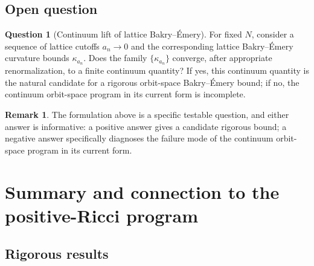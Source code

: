 \documentclass[11pt,letterpaper]{article}
\theoremstyle{definition}
\newtheorem{remark}[theorem]{Remark}
\newtheorem{question}[theorem]{Question}
\begin{document}
\subsection{Open question}

\begin{question}[Continuum lift of lattice Bakry--\'Emery]\label{q:continuum-lift}
For fixed $N$, consider a sequence of lattice cutoffs $a_n \to 0$ and the corresponding lattice Bakry--\'Emery curvature bounds $\kappa_{a_n}$. Does the family $\{\kappa_{a_n}\}$ converge, after appropriate renormalization, to a finite continuum quantity? If yes, this continuum quantity is the natural candidate for a rigorous orbit-space Bakry--\'Emery bound; if no, the continuum orbit-space program in its current form is incomplete.
\end{question}

\begin{remark}
The formulation above is a specific testable question, and either answer is informative: a positive answer gives a candidate rigorous bound; a negative answer specifically diagnoses the failure mode of the continuum orbit-space program in its current form.
\end{remark}

\section{Summary and connection to the positive-Ricci program}\label{sec:summary}

\subsection{Rigorous results}
\end{document}
